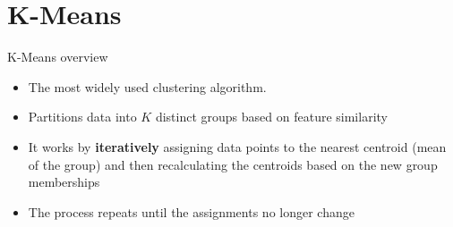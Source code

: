 \documentclass[serif, aspectratio=169]{beamer}
\begin{document}

            

\section{K-Means}
\begin{frame}{K-Means overview}
    \begin{itemize}
        \item The most widely used clustering algorithm.
        \item Partitions data into $K$ distinct groups based on feature similarity
        \item It works by \textbf{iteratively} assigning data points to the nearest centroid (mean of the group) and then recalculating the centroids based on the new group memberships
        \item The process repeats until the assignments no longer change
    \end{itemize}
\end{frame}

\end{document}

